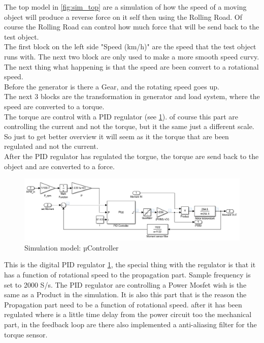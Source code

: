The top model in \ref{fig:sim_top} are a simulation of how the speed of a moving object will produce a reverse force on it self then using the Rolling Road. Of course the Rolling Road can control how much force that will be send back to the test object.\\
The first block on the left side "Speed (km/h)" are the speed that the test object runs with. The next two block are only used to make a more smooth speed curvy.\\
The next thing what happening is that the speed are been convert to a rotational speed.\\
Before the generator is there a Gear, and the rotating speed goes up.\\
The next 3 blocks are the transformation in generator and load system, where the speed are converted to a torque.\\
The torque are control with a PID regulator (see \ref{fig:sim_PSOC}). of course this part are controlling the current and not the torque, but it the same just a different scale. So just to get better overview it will seem as it the torque that are been regulated and not the current.\\ 
After the PID regulator has regulated the torgue, the torque are send back to the object and are converted to a force.   

\begin{figure}[H]
	\centering
	\includegraphics [width=6in]{Hardware/Pictures/simulation_uController.PNG}
	\caption{Simulation model: µController}
	\label{fig:sim_PSOC}
\end{figure}  

This is the digital PID regulator \ref{fig:sim_PSOC}, the special thing with the regulator is that it has a function of rotational speed to the propagation part. Sample frequency is set to 2000 S/s. The PID regulator are controlling a Power Mosfet wish is the same as a Product in the simulation. It is also this part that is the reason the Propagation part need to be a function of rotational speed. after it has been regulated where is a little time delay from the power circuit too the mechanical part, in the feedback loop are there also implemented a anti-aliasing filter for the torque sensor.  